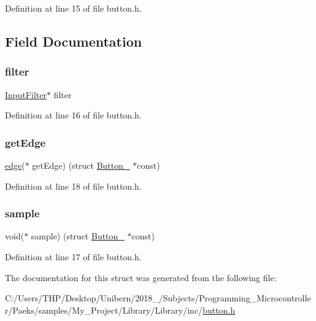 Definition at line 15 of file button.\+h.



\subsection{Field Documentation}
\mbox{\label{struct_button___a9568e563650fcb16283e6df6008722e9}} 
\subsubsection{\texorpdfstring{filter}{filter}}
{\footnotesize\ttfamily \mbox{\hyperlink{button_8h_aa0f38bbf6320aea7cc99c3a77ed46d80}{Input\+Filter}}$\ast$ filter}



Definition at line 16 of file button.\+h.

\mbox{\label{struct_button___a164ee133b5e4233ebd6a6849f806f551}} 
\subsubsection{\texorpdfstring{get\+Edge}{getEdge}}
{\footnotesize\ttfamily \mbox{\hyperlink{button_8h_a4ef43ff5c6d42dacbc8ffd9c8cfdc189}{edge}}($\ast$ get\+Edge) (struct \mbox{\hyperlink{struct_button__}{Button\+\_\+}} $\ast$const)}



Definition at line 18 of file button.\+h.

\mbox{\label{struct_button___a54894037c0b758948b3d4d4ac39c2c0c}} 
\subsubsection{\texorpdfstring{sample}{sample}}
{\footnotesize\ttfamily void($\ast$ sample) (struct \mbox{\hyperlink{struct_button__}{Button\+\_\+}} $\ast$const)}



Definition at line 17 of file button.\+h.



The documentation for this struct was generated from the following file\+:\begin{DoxyCompactItemize}
\item 
C\+:/\+Users/\+T\+H\+P/\+Desktop/\+Unibern/2018\+\_/\+Subjects/\+Programming\+\_\+\+Microcontroller/\+Paeks/samples/\+My\+\_\+\+Project/\+Library/\+Library/inc/\mbox{\hyperlink{button_8h}{button.\+h}}\end{DoxyCompactItemize}
